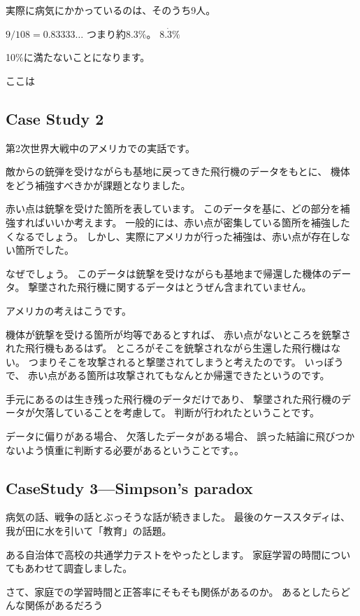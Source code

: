 \documentclass[uplatex,jis2004,dvipdfmx,12pt]{jsarticle}
\begin{document}
実際に病気にかかっているのは、そのうち9人。

$9/108=0.83333\dots$
つまり約8.3\%。
$8.\dot{3}\%$

10\%に満たないことになります。


ここは



\subsection{Case Study 2}

第2次世界大戦中のアメリカでの実話です。


敵からの銃弾を受けながらも基地に戻ってきた飛行機のデータをもとに、
機体をどう補強すべきかが課題となりました。

赤い点は銃撃を受けた箇所を表しています。
このデータを基に、どの部分を補強すればいいか考えます。
一般的には、赤い点が密集している箇所を補強したくなるでしょう。
しかし、実際にアメリカが行った補強は、赤い点が存在しない箇所でした。


なぜでしょう。
このデータは銃撃を受けながらも基地まで帰還した機体のデータ。
撃墜された飛行機に関するデータはとうぜん含まれていません。

アメリカの考えはこうです。

機体が銃撃を受ける箇所が均等であるとすれば、
赤い点がないところを銃撃された飛行機もあるはず。
ところがそこを銃撃されながら生還した飛行機はない。
つまりそこを攻撃されると撃墜されてしまうと考えたのです。
いっぽうで、
赤い点がある箇所は攻撃されてもなんとか帰還できたというのです。

手元にあるのは生き残った飛行機のデータだけであり、
撃墜された飛行機のデータが欠落していることを考慮して。
判断が行われたということです。

データに偏りがある場合、
欠落したデータがある場合、
誤った結論に飛びつかないよう慎重に判断する必要があるということです。。


\subsection{CaseStudy 3---Simpson's paradox}


病気の話、戦争の話とぶっそうな話が続きました。
最後のケーススタディは、我が田に水を引いて「教育」の話題。


ある自治体で高校の共通学力テストをやったとします。
家庭学習の時間についてもあわせて調査しました。


さて、家庭での学習時間と正答率にそもそも関係があるのか。
あるとしたらどんな関係があるだろう
\end{document}
